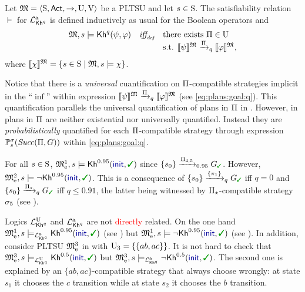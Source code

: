 \begin{definition}\label{def:semantics:PKhadapt}
  Let $\model = \tup{\S,\Act,\ra,\Unc,\V}$ be a PLTSU and let $s\in\S$.  The
  satisfiability relation $\models$ for $\PKhadapt$ is defined inductively 
  as usual for the Boolean operators and
  \[
  \begin{array}{l@{\ \ \ }c@{\ \ \  }l}
    \model, s \models \kh^q(\psi,\varphi) & \iffdef &  \text{there exists } {\plans \in \Unc}  \\
    & & \text{s.t. } {\truthset{\model}{\psi} \reach{\plans}_q \truthset{\model}{\varphi}}, 
  \end{array}
  \]    
  where $\truthset{\model}{\chi} = \csetsc{s\in\S}{\model,s\models\chi}$.
\end{definition}

Notice that there is a \emph{universal} cuantification on
$\plans$-compatible strategies implicit in the ``$\inf$'' within
expression
$\truthset{\model}{\psi}\reach{\plans}_q\truthset{\model}{\varphi}$
(see \cref{eq:plans:goal:q}).
%
This quantification parallels the universal quantification of plans in
$\plans$ in .
%
However, in  plans in $\plans$ are
neither existential nor universally quantified.  Instead they are
\emph{probabilistically} quantified for each $\plans$-compatible
strategy through expression $\Prob^\strat_s(\Succ(\plans,G))$ within
\cref{eq:plans:goal:q}.


\begin{example}\label{ex:running:pkhadapt}
  For all $s\in\S$, $\modelex^1,s \models \kh^{0.95}(\init,\goal)$ since 
  $\{s_0\}\reach{\plans_{4,5}}_{0.95}G_{\goal}$.
  However, $\modelex^2,s \models \neg\kh^{0.95}(\init,\goal)$.  This
  is a consequence of $\{s_0\}\reach{\{\plan_1\}}_qG_{\goal}$ iff
  $q=0$ and $\{s_0\}\reach{\plans_{\star}}_qG_{\goal}$ iff $q\leq
  0.91$, the latter being witnessed by $\plans_{\star}$-compatible
  strategy $\strat_5$ (see ).
\end{example}


Logics $\PKhunc$ and $\PKhadapt$ are not \textcolor{red}{directly} related.
%
On the one hand
$\modelex^1,s \models_\PKhadapt \kh^{0.95}(\init,\goal)$
(see ) but
$\modelex^1,s \models \neg\kh^{0.95}(\init,\goal)$
(see ).
%
In addition, consider PLTSU $\modelex^3$ in 
with $\Unc_3=\{\{ab,ac\}\}$.  It is not hard to check that
$\modelex^3,s \models_\PKhunc \kh^{0.5}(\init,\goal)$ but 
$\modelex^3,s \models_\PKhadapt \neg\kh^{0.5}(\init,\goal)$.
The second one is explained by an $\{ab,ac\}$-compatible strategy that
always choose wrongly: at state $s_1$ it chooses the $c$ transition
while at state $s_2$ it chooses the $b$ transition.

